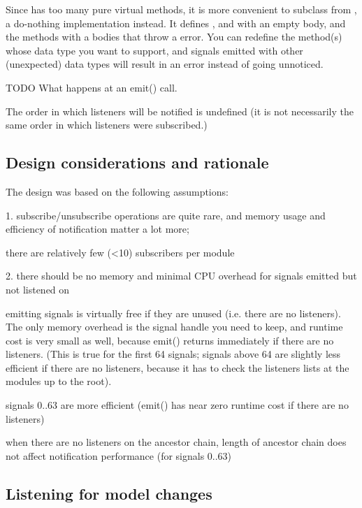 \begin{note}
\begin{note}
Since  has too many pure virtual methods, it is more
convenient to subclass from , a do-nothing implementation
instead. It defines ,  and
 with an empty body, and the 
methods with a bodies that throw a  error.
You can redefine the  method(s) whose data type
you want to support, and signals emitted with other (unexpected) data
types will result in an error instead of going unnoticed.

TODO What happens at an emit() call.

The order in which listeners will be notified is undefined (it is not necessarily
the same order in which listeners were subscribed.)


\subsection{Design considerations and rationale}

The design was based on the following assumptions:

1. subscribe/unsubscribe operations are quite rare,
and memory usage and efficiency of notification matter a lot more;

there are relatively few (<10) subscribers per module

2. there should be no memory and minimal CPU overhead for signals emitted but not listened on

emitting signals is virtually free if they are unused (i.e. there are
no listeners). The only memory overhead is the signal handle you need
to keep, and runtime cost is very small as well, because emit()
returns immediately if there are no listeners. (This is true for the
first 64 signals; signals above 64 are slightly less efficient if there
are no listeners, because it has to check the listeners lists at
the modules up to the root).

signals 0..63 are more efficient (emit() has near zero runtime cost if there
are no listeners)

when there are no listeners on the ancestor chain, length of ancestor chain
does not affect notification performance (for signals 0..63)



\subsection{Listening for model changes}


\end{note}
\end{note}

